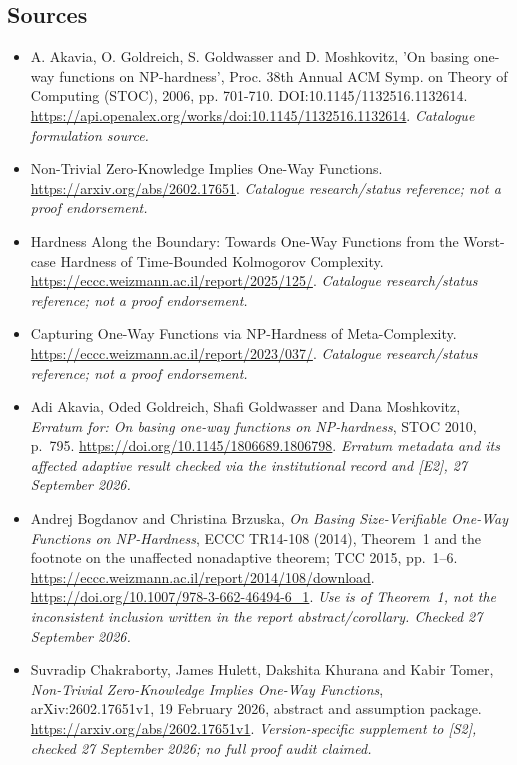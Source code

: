 \documentclass[11pt,a4paper]{article}
\numberwithin{equation}{section}
\begin{document}
\subsection{Sources}
\begin{itemize}\raggedright
\item[\textnormal{[S1]}]\hypertarget{source:statement:1}{} A. Akavia, O. Goldreich, S. Goldwasser and D. Moshkovitz, 'On basing one-way functions on NP-hardness', Proc. 38th Annual ACM Symp. on Theory of Computing (STOC), 2006, pp. 701-710. DOI:10.1145/1132516.1132614.
\url{https://api.openalex.org/works/doi:10.1145/1132516.1132614}.
{\small\textit{Catalogue formulation source.}}
\item[\textnormal{[S2]}]\hypertarget{source:statement:2}{} Non-Trivial Zero-Knowledge Implies One-Way Functions.
\url{https://arxiv.org/abs/2602.17651}.
{\small\textit{Catalogue research/status reference; not a proof endorsement.}}
\item[\textnormal{[S3]}]\hypertarget{source:statement:3}{} Hardness Along the Boundary: Towards One-Way Functions from the Worst-case Hardness of Time-Bounded Kolmogorov Complexity.
\url{https://eccc.weizmann.ac.il/report/2025/125/}.
{\small\textit{Catalogue research/status reference; not a proof endorsement.}}
\item[\textnormal{[S4]}]\hypertarget{source:statement:4}{} Capturing One-Way Functions via NP-Hardness of Meta-Complexity.
\url{https://eccc.weizmann.ac.il/report/2023/037/}.
{\small\textit{Catalogue research/status reference; not a proof endorsement.}}
\item[\textnormal{[E1]}]\hypertarget{extra:statement:1}{} Adi Akavia, Oded
Goldreich, Shafi Goldwasser and Dana Moshkovitz, \emph{Erratum for: On
basing one-way functions on NP-hardness}, STOC 2010, p.~795.
\url{https://doi.org/10.1145/1806689.1806798}.
{\small\textit{Erratum metadata and its affected adaptive result checked
via the institutional record and [E2], 27 September 2026.}}
\item[\textnormal{[E2]}]\hypertarget{extra:statement:2}{} Andrej Bogdanov and
Christina Brzuska, \emph{On Basing Size-Verifiable One-Way Functions on
NP-Hardness}, ECCC TR14-108 (2014), Theorem~1 and the footnote on the
unaffected nonadaptive theorem; TCC 2015, pp.~1--6.
\url{https://eccc.weizmann.ac.il/report/2014/108/download}.
\url{https://doi.org/10.1007/978-3-662-46494-6_1}.
{\small\textit{Use is of Theorem~1, not the inconsistent inclusion written
in the report abstract/corollary. Checked 27 September 2026.}}
\item[\textnormal{[E3]}]\hypertarget{extra:statement:3}{} Suvradip Chakraborty,
James Hulett, Dakshita Khurana and Kabir Tomer, \emph{Non-Trivial
Zero-Knowledge Implies One-Way Functions}, arXiv:2602.17651v1,
19 February 2026, abstract and assumption package.
\url{https://arxiv.org/abs/2602.17651v1}.
{\small\textit{Version-specific supplement to [S2], checked
27 September 2026; no full proof audit claimed.}}

\end{itemize}

\end{document}
